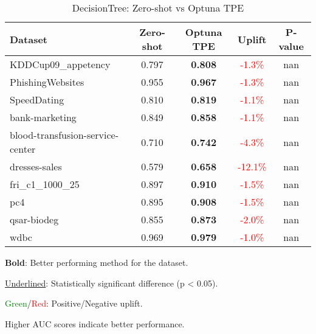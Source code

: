 \begin{table}[htbp]
\centering
\caption{DecisionTree: Zero-shot vs Optuna TPE}
\label{tab:decisiontree_zeroshot_vs_optuna}
\begin{tabular}{lcccc}
\toprule
Dataset & Zero-shot & Optuna TPE & Uplift & P-value \\
\midrule
KDDCup09\_appetency & 0.797 & \textbf{0.808} & \textcolor{red}{-1.3\%} & nan \\
PhishingWebsites & 0.955 & \textbf{0.967} & \textcolor{red}{-1.3\%} & nan \\
SpeedDating & 0.810 & \textbf{0.819} & \textcolor{red}{-1.1\%} & nan \\
bank-marketing & 0.849 & \textbf{0.858} & \textcolor{red}{-1.1\%} & nan \\
blood-transfusion-service-center & 0.710 & \textbf{0.742} & \textcolor{red}{-4.3\%} & nan \\
dresses-sales & 0.579 & \textbf{0.658} & \textcolor{red}{-12.1\%} & nan \\
fri\_c1\_1000\_25 & 0.897 & \textbf{0.910} & \textcolor{red}{-1.5\%} & nan \\
pc4 & 0.895 & \textbf{0.908} & \textcolor{red}{-1.5\%} & nan \\
qsar-biodeg & 0.855 & \textbf{0.873} & \textcolor{red}{-2.0\%} & nan \\
wdbc & 0.969 & \textbf{0.979} & \textcolor{red}{-1.0\%} & nan \\
\bottomrule
\end{tabular}
\begin{tablenotes}
\small
\item \textbf{Bold}: Better performing method for the dataset.
\item \underline{Underlined}: Statistically significant difference (p < 0.05).
\item \textcolor{green}{Green}/\textcolor{red}{Red}: Positive/Negative uplift.
\item Higher AUC scores indicate better performance.
\end{tablenotes}
\end{table}